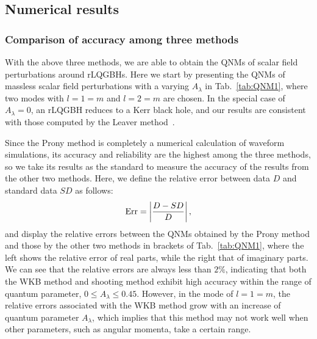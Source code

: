 \documentclass[12pt]{article}
\begin{document}
\subsection{Numerical results}\label{sec:num-result}
 
\subsubsection{Comparison of accuracy among three methods}\label{sec:MPC}
With the above three methods, we are able to obtain the QNMs of scalar field perturbations around rLQGBHs. Here we start by presenting the QNMs of massless scalar field perturbations with a varying $A_\lambda$ in Tab.~\ref{tab:QNM1}, where two modes with $l=1=m$ and $l=2=m$ are chosen.
In the special case of $A_\lambda=0$, an rLQGBH reduces to a Kerr black hole, and our results are consistent with those computed by the Leaver method~\cite{konoplya2006stability}. 

Since the Prony method is completely a numerical calculation of waveform simulations, its accuracy and reliability are the highest among the three methods, so we take its results as the standard to measure the accuracy of the results from the other two methods.
Here, we define the relative error between data $D$ and standard data $SD$ as follows:
\begin{equation}
     {\rm Err}=\left|\frac{D-SD}{D}\right|,
\end{equation}
and display the relative errors between the QNMs obtained by the Prony method and those by the other two methods in brackets
of Tab.~\ref{tab:QNM1}, where the left shows the relative error of real parts, while the right that of imaginary parts. We can see that
the relative errors are always less than $2\%$, indicating that both the WKB method and shooting method exhibit high accuracy within the range of quantum parameter, $0\le A_\lambda \le 0.45$.
However, in the mode of $l=1=m$, the relative errors associated with the WKB method grow with an increase of quantum parameter $A_\lambda$, which implies that this method may not work well when other parameters, such as angular momenta, take a certain range.
\end{document}
